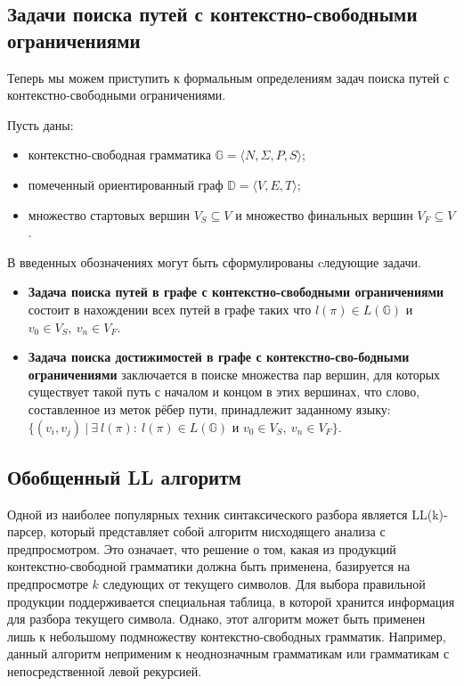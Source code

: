 \subsection{Задачи поиска путей с контекстно-свободными ограничениями}
Теперь мы можем приступить к формальным определениям задач поиска путей с контекстно-свободными ограничениями.

Пусть даны:
\begin{itemize}
      \item контекстно-свободная грамматика $\mathbb{G} = \langle N, \Sigma, P, S \rangle$;
      \item помеченный ориентированный граф $\mathbb{D} = \langle V, E, T \rangle$;
      \item  множество стартовых вершин $V_S \subseteq V$ и множество финальных вершин \mbox {$V_F \subseteq V$}.
\end{itemize}

В введенных обозначениях могут быть сформулированы cледующие задачи.

\begin{itemize}
    \item \textbf{Задача поиска путей в графе с контекстно-свободными ограничениями} состоит в нахождении всех путей в графе таких что $l(\pi) \in L(\mathbb{G})$ и $v_0 \in V_S, ~v_n \in V_F$.
    \item \textbf{Задача поиска достижимостей в графе с контекстно-сво-бодными ограничениями} заключается в поиске множества пар вершин, для которых существует такой путь с началом и концом в этих вершинах, что слово, составленное из меток рёбер пути, принадлежит заданному языку: $\{(v_i, v_j ) ~|~ \exists ~l(\pi): ~l(\pi) \in L(\mathbb{G})$ и $v_0 \in V_S, ~v_n \in V_F\}$.
\end{itemize}

\subsection{Обобщенный LL алгоритм}
Одной из наиболее популярных техник синтаксического разбора является LL(k)-парсер, который представляет собой алгоритм нисходящего анализа с предпросмотром. 
Это означает, что решение о том, какая из продукций контекстно-свободной грамматики должна быть применена, базируется на предпросмотре $k$ следующих от текущего символов.
Для выбора правильной продукции поддерживается специальная таблица, в которой хранится информация для разбора текущего символа.
Однако, этот алгоритм может быть применен лишь к небольшому подмножеству контекстно-свободных грамматик.
Например, данный алгоритм неприменим к неоднозначным грамматикам или грамматикам с непосредственной левой рекурсией.

